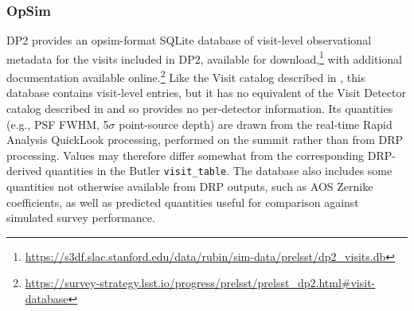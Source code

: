 \subsubsection{OpSim}
\label{sssec:opsim}
%
\gls{DP2} provides an opsim-format SQLite database of visit-level observational metadata for the visits included in \gls{DP2}, available for download,\footnote{\url{https://s3df.slac.stanford.edu/data/rubin/sim-data/prelsst/dp2_visits.db}} with additional documentation available online.\footnote{\url{https://survey-strategy.lsst.io/progress/prelsst/prelsst_dp2.html\#visit-database}}
Like the Visit catalog described in , this database contains visit-level entries, but it has no equivalent of the Visit Detector catalog described in  and so provides no per-detector information.
Its quantities (e.g., PSF FWHM, 5$\sigma$ point-source depth) are drawn from the real-time Rapid Analysis QuickLook processing, \citep[][]{SITCOMTN-100} performed on the summit rather than from \gls{DRP} processing.
Values may therefore differ somewhat from the corresponding \gls{DRP}-derived quantities in the Butler \texttt{visit\_table}.
The database also includes some quantities not otherwise available from \gls{DRP} outputs, such as \gls{AOS} Zernike coefficients, as well as predicted quantities useful for comparison against simulated survey performance.
